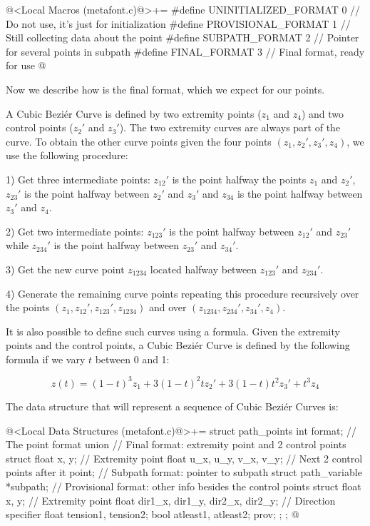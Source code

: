 \iniciocodigo
@<Local Macros (metafont.c)@>+=
#define UNINITIALIZED_FORMAT 0 // Do not use, it's just for initialization
#define PROVISIONAL_FORMAT   1 // Still collecting data about the point
#define SUBPATH_FORMAT       2 // Pointer for several points in subpath
#define FINAL_FORMAT         3 // Final format, ready for use
@
\fimcodigo

Now we describe how is the final format, which we expect for our
points.

A Cubic Beziér Curve is defined by two extremity points ($z_1$ and
$z_4$) and two control points ($z_2'$ and $z_3'$). The two extremity
curves are always part of the curve. To obtain the other curve points
given the four points $(z_1, z_2', z_3', z_4)$, we use the following
procedure:

1) Get three intermediate points: $z_{12}'$ is the point halfway the
points $z_1$ and $z_2'$, $z_{23}'$ is the point halfway between $z_2'$
and $z_3'$ and $z_{34}$ is the point halfway between $z_3'$ and $z_4$.

2) Get two intermediate points: $z_{123}'$ is the point halfway
between $z_{12}'$ and $z_{23}'$ while $z_{234}'$ is the point halfway
between $z_{23}'$ and $z_{34}'$.

3) Get the new curve point $z_{1234}$ located halfway between
$z_{123}'$ and $z_{234}'$.

4) Generate the remaining curve points repeating this procedure
recursively over the points $(z_1, z_{12}', z_{123}', z_{1234})$ and
over $(z_{1234}, z_{234}', z_{34}', z_4)$.

It is also possible to define such curves using a formula. Given the
extremity points and the control points, a Cubic Beziér Curve is
defined by the following formula if we vary $t$ between 0 and 1:

$$
z(t) = (1-t)^3z_1 + 3(1-t)^2tz_2' + 3(1-t)t^2z_3'+t^3z_4
$$

The data structure that will represent a sequence of Cubic Beziér
Curves is:

\iniciocodigo
@<Local Data Structures (metafont.c)@>+=
struct path_points{
  int format; // The point format
  union{
    // Final format: extremity point and 2 control points
    struct{
      float x, y; // Extremity point
      float u_x, u_y, v_x, v_y;   // Next 2 control points after it
    } point;
    // Subpath format: pointer to subpath
    struct path_variable *subpath;
    // Provisional format: other info besides the control points
    struct{
      float x, y; // Extremity point
      float dir1_x, dir1_y, dir2_x, dir2_y; // Direction specifier
      float tension1, tension2;
      bool atleast1, atleast2;
    } prov;
  };
};
@
\fimcodigo


